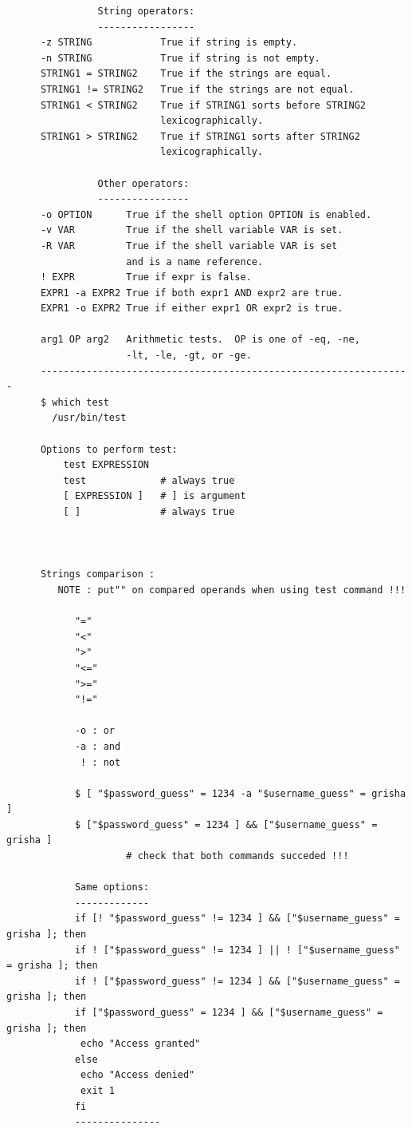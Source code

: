 \documentclass[a4paper,12pt]{article}
\begin{document}
\begin{verbatim}
                String operators:
                -----------------
      -z STRING            True if string is empty.
      -n STRING            True if string is not empty.
      STRING1 = STRING2    True if the strings are equal.
      STRING1 != STRING2   True if the strings are not equal.
      STRING1 < STRING2    True if STRING1 sorts before STRING2  
                           lexicographically.
      STRING1 > STRING2    True if STRING1 sorts after STRING2 
                           lexicographically.
      
                Other operators:
                ----------------
      -o OPTION      True if the shell option OPTION is enabled.
      -v VAR         True if the shell variable VAR is set.
      -R VAR         True if the shell variable VAR is set 
                     and is a name reference.
      ! EXPR         True if expr is false.
      EXPR1 -a EXPR2 True if both expr1 AND expr2 are true.
      EXPR1 -o EXPR2 True if either expr1 OR expr2 is true.
    
      arg1 OP arg2   Arithmetic tests.  OP is one of -eq, -ne,
                     -lt, -le, -gt, or -ge.
      -----------------------------------------------------------------
      $ which test
        /usr/bin/test
      
      Options to perform test:
          test EXPRESSION
          test             # always true
          [ EXPRESSION ]   # ] is argument
          [ ]              # always true
            
      
      
      Strings comparison : 
         NOTE : put"" on compared operands when using test command !!!
      
            "="
            "<"
            ">"
            "<="
            ">="
            "!="
            
            -o : or
            -a : and
             ! : not
            
            $ [ "$password_guess" = 1234 -a "$username_guess" = grisha ]
            $ ["$password_guess" = 1234 ] && ["$username_guess" = grisha ]  
                     # check that both commands succeded !!!
            
            Same options:
            ------------- 
            if [! "$password_guess" != 1234 ] && ["$username_guess" = grisha ]; then  
            if ! ["$password_guess" != 1234 ] || ! ["$username_guess" = grisha ]; then 
            if ! ["$password_guess" != 1234 ] && ["$username_guess" = grisha ]; then   
            if ["$password_guess" = 1234 ] && ["$username_guess" = grisha ]; then 
	         echo "Access granted"
            else 
	         echo "Access denied"
	         exit 1
            fi
            ---------------
            

\end{verbatim}
\end{document}
